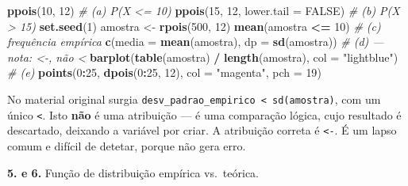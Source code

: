 \documentclass[
  portuguese,
  11pt,
  openany]{book}
\newenvironment{Shaded}{\begin{snugshade}}{\end{snugshade}}
\newcommand{\AttributeTok}[1]{\textcolor[rgb]{0.13,0.29,0.53}{#1}}
\newcommand{\CommentTok}[1]{\textcolor[rgb]{0.56,0.35,0.01}{\textit{#1}}}
\newcommand{\ConstantTok}[1]{\textcolor[rgb]{0.56,0.35,0.01}{#1}}
\newcommand{\DecValTok}[1]{\textcolor[rgb]{0.00,0.00,0.81}{#1}}
\newcommand{\FunctionTok}[1]{\textcolor[rgb]{0.13,0.29,0.53}{\textbf{#1}}}
\newcommand{\NormalTok}[1]{#1}
\newcommand{\OtherTok}[1]{\textcolor[rgb]{0.56,0.35,0.01}{#1}}
\newcommand{\SpecialCharTok}[1]{\textcolor[rgb]{0.81,0.36,0.00}{\textbf{#1}}}
\newcommand{\StringTok}[1]{\textcolor[rgb]{0.31,0.60,0.02}{#1}}
\begin{document}
\begin{Shaded}
\begin{Highlighting}[]
\FunctionTok{ppois}\NormalTok{(}\DecValTok{10}\NormalTok{, }\DecValTok{12}\NormalTok{)                       }\CommentTok{\# (a) P(X \textless{}= 10)}
\FunctionTok{ppois}\NormalTok{(}\DecValTok{15}\NormalTok{, }\DecValTok{12}\NormalTok{, }\AttributeTok{lower.tail =} \ConstantTok{FALSE}\NormalTok{)   }\CommentTok{\# (b) P(X \textgreater{} 15)}
\FunctionTok{set.seed}\NormalTok{(}\DecValTok{1}\NormalTok{)}
\NormalTok{amostra }\OtherTok{\textless{}{-}} \FunctionTok{rpois}\NormalTok{(}\DecValTok{500}\NormalTok{, }\DecValTok{12}\NormalTok{)}
\FunctionTok{mean}\NormalTok{(amostra }\SpecialCharTok{\textless{}=} \DecValTok{10}\NormalTok{)                  }\CommentTok{\# (c) frequência empírica}
\FunctionTok{c}\NormalTok{(}\AttributeTok{media =} \FunctionTok{mean}\NormalTok{(amostra), }\AttributeTok{dp =} \FunctionTok{sd}\NormalTok{(amostra))   }\CommentTok{\# (d)  — nota: \textquotesingle{}\textless{}{-}\textquotesingle{}, não \textquotesingle{}\textless{}\textquotesingle{}}
\FunctionTok{barplot}\NormalTok{(}\FunctionTok{table}\NormalTok{(amostra) }\SpecialCharTok{/} \FunctionTok{length}\NormalTok{(amostra), }\AttributeTok{col =} \StringTok{"lightblue"}\NormalTok{)   }\CommentTok{\# (e)}
\FunctionTok{points}\NormalTok{(}\DecValTok{0}\SpecialCharTok{:}\DecValTok{25}\NormalTok{, }\FunctionTok{dpois}\NormalTok{(}\DecValTok{0}\SpecialCharTok{:}\DecValTok{25}\NormalTok{, }\DecValTok{12}\NormalTok{), }\AttributeTok{col =} \StringTok{"magenta"}\NormalTok{, }\AttributeTok{pch =} \DecValTok{19}\NormalTok{)}
\end{Highlighting}
\end{Shaded}

No material original surgia \texttt{desv\_padrao\_empirico\ \textless{}\ sd(amostra)}, com um único
\texttt{\textless{}}. Isto \textbf{não} é uma atribuição --- é uma comparação lógica, cujo resultado é
descartado, deixando a variável por criar. A atribuição correta é \texttt{\textless{}-}. É um
lapso comum e difícil de detetar, porque não gera erro.

\textbf{5. e 6.} Função de distribuição empírica vs.~teórica.
\end{document}

